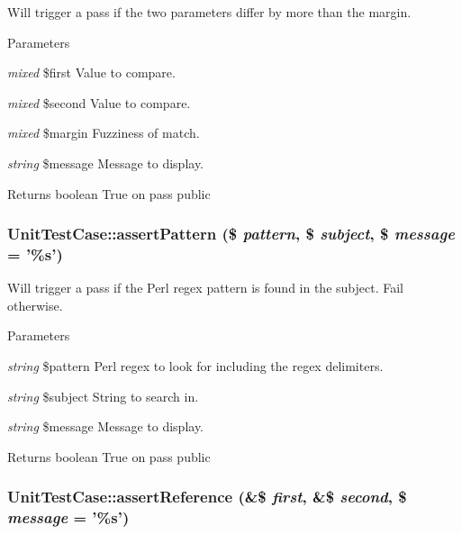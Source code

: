 \label{class_unit_test_case_a8e3b8d5600731e494ad281ea165f2a53}
Will trigger a pass if the two parameters differ by more than the margin. 
\begin{DoxyParams}{Parameters}
\item[{\em mixed}]\$first Value to compare. \item[{\em mixed}]\$second Value to compare. \item[{\em mixed}]\$margin Fuzziness of match. \item[{\em string}]\$message Message to display. \end{DoxyParams}
\begin{DoxyReturn}{Returns}
boolean True on pass  public 
\end{DoxyReturn}
\hypertarget{class_unit_test_case_afddf643f99b03b10e9130adef47ffb45}{
\subsubsection[{assertPattern}]{\setlength{\rightskip}{0pt plus 5cm}UnitTestCase::assertPattern (\$ {\em pattern}, \/  \$ {\em subject}, \/  \$ {\em message} = {\ttfamily '\%s'})}}
\label{class_unit_test_case_afddf643f99b03b10e9130adef47ffb45}
Will trigger a pass if the Perl regex pattern is found in the subject. Fail otherwise. 
\begin{DoxyParams}{Parameters}
\item[{\em string}]\$pattern Perl regex to look for including the regex delimiters. \item[{\em string}]\$subject String to search in. \item[{\em string}]\$message Message to display. \end{DoxyParams}
\begin{DoxyReturn}{Returns}
boolean True on pass  public 
\end{DoxyReturn}
\hypertarget{class_unit_test_case_a14a8294747390eb7ce1238d0fb00d5f1}{
\subsubsection[{assertReference}]{\setlength{\rightskip}{0pt plus 5cm}UnitTestCase::assertReference (\&\$ {\em first}, \/  \&\$ {\em second}, \/  \$ {\em message} = {\ttfamily '\%s'})}}
